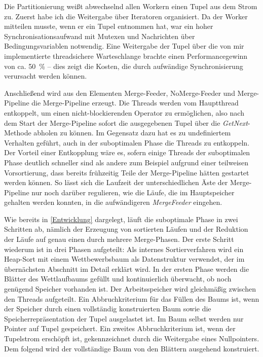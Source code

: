 \documentclass[a4paper,12pt,twoside]{article}
\newcommand{\Fb}[1]{\textit{#1}} %
\begin{document}
Die Partitionierung weißt abwechselnd allen Workern einen Tupel aus dem Strom zu. Zuerst habe ich die Weitergabe über Iteratoren organisiert. Da der Worker mitteilen musste, wenn er ein Tupel entnommen hat, war ein hoher Synchronisationsaufwand mit Mutexen und Nachrichten über Bedingungsvariablen notwendig. Eine Weitergabe der Tupel über die von mir implementierte threadsichere Warteschlange brachte einen Performancegewinn von ca. 50~\% -- dies zeigt die Kosten, die durch aufwändige Synchronisierung verursacht werden können.

Anschließend wird aus den Elementen Merge-Feeder, NoMerge-Feeder und Merge-Pipeline die Merge-Pipeline erzeugt. Die Threads werden vom Hauptthread entkoppelt, um einen nicht-blockierenden Operator zu ermöglichen, also nach dem Start der Merge-Pipeline sofort die ausgegebenen Tupel über die \Fb{GetNext}-Methode abholen zu können. Im Gegensatz dazu hat es zu undefiniertem Verhalten geführt, auch in der suboptimalen Phase die Threads zu entkoppeln. Der Vorteil einer Entkopplung wäre es, sofern einige Threads der suboptimalen Phase deutlich schneller sind als andere zum Beispiel aufgrund einer teilweisen Vorsortierung, dass bereits frühzeitig Teile der Merge-Pipeline hätten gestartet werden können. So lässt sich die Laufzeit der unterschiedlichen Äste der Merge-Pipeline nur noch darüber regulieren, wie die Läufe, die im Hauptspeicher gehalten werden konnten, in die aufwändigeren \Fb{MergeFeeder} eingehen.

Wie bereits in \autoref{Entwicklung} dargelegt, läuft die suboptimale Phase in zwei Schritten ab, nämlich der Erzeugung von sortierten Läufen und der Reduktion der Läufe auf genau einen durch mehrere Merge-Phasen. Der erste Schritt wiederum ist in drei Phasen aufgeteilt: Als internes Sortierverfahren wird ein Heap-Sort mit einem Wettbewerbsbaum als Datenstruktur verwendet, der im übernächsten Abschnitt im Detail erklärt wird. In der ersten Phase werden die Blätter des Wettlaufbaums gefüllt und kontinuierlich überwacht, ob noch genügend Speicher vorhanden ist. Der Arbeitsspeicher wird gleichmäßig zwischen den Threads aufgeteilt. Ein Abbruchkriterium für das Füllen des Baums ist, wenn der Speicher durch einen vollständig konstruierten Baum sowie die Speicherrepräsentation der Tupel ausgelastet ist. Im Baum selbst werden nur Pointer auf Tupel gespeichert. Ein zweites Abbruchkriterium ist, wenn der Tupelstrom erschöpft ist, gekennzeichnet durch die Weitergabe eines Nullpointers. Dem folgend wird der vollständige Baum von den Blättern ausgehend konstruiert.
\end{document}
